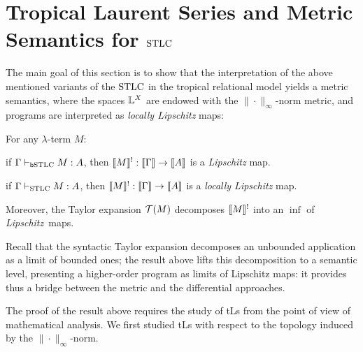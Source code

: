 \documentclass[submission,%
]{eptcs}
\begin{document}
\section{Tropical Laurent Series and Metric Semantics for $\mathrm{STLC}$}

The main goal of this section is to show that the interpretation of the above mentioned variants of the $\mathrm{STLC}$ in the tropical relational model yields a metric semantics, where the spaces $\mathbb{L}^{X}$ are endowed with the $\|\cdot\|_{\infty}$-norm metric, and programs are interpreted as \emph{locally Lipschitz} maps:
\begin{theorem}\label{cor:main}
For any $\lambda$-term $M$:
\begin{varenumerate}
\item if $\Gamma \vdash_{\mathsf b\mathrm{STLC}} M:A$, then $\llbracket M\rrbracket^!:\llbracket\Gamma\rrbracket \to \llbracket A\rrbracket$ is a \emph{Lipschitz} map.
\item if $\Gamma \vdash_{\mathrm{STLC}}M:A$, then $\llbracket M\rrbracket^!: \llbracket\Gamma\rrbracket \to \llbracket A\rrbracket$ is a \emph{locally Lipschitz} map.

Moreover, the Taylor expansion $\mathcal{T}(M)$ decomposes $\llbracket M\rrbracket^!$ into an $\inf$ of \emph{Lipschitz}~maps.
\end{varenumerate}
\end{theorem}
Recall that the syntactic Taylor expansion decomposes an unbounded application as a limit of bounded ones;
the result above lifts this decomposition to a semantic level, presenting a higher-order program as limits of Lipschitz maps: it provides thus a bridge between the metric and the differential approaches.

 
The proof of the result above requires the study of %
tLs from the point of view of mathematical analysis. 
We first studied tLs with respect to the topology induced by the $\|\cdot\|_{\infty}$-norm.


%
 
% 
%

\end{document}
